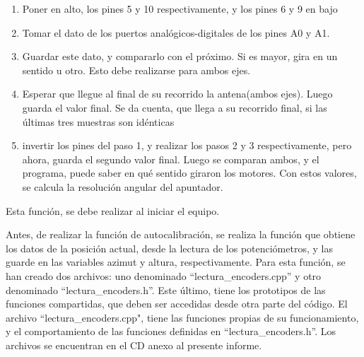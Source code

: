 \begin{enumerate}
	\item Poner en alto, los pines 5 y 10 respectivamente, y los pines 6 y 9 en bajo  
	\item Tomar el dato de los puertos analógicos-digitales de los pines A0 y A1. 
	\item Guardar este dato, y compararlo con el próximo. Si es mayor, gira en un sentido u otro. Esto debe realizarse para ambos ejes. 
	\item Esperar que llegue al final de su recorrido la antena(ambos ejes). Luego guarda el valor final. Se da cuenta, que llega a su recorrido final, si las últimas tres muestras son idénticas
   \item invertir los pines del paso 1, y realizar los pasos 2 y 3 respectivamente, pero ahora, guarda el segundo valor final. Luego se comparan ambos, y el programa, puede saber en qué sentido giraron los motores. Con estos valores, se calcula la resolución angular del apuntador. 
\end{enumerate}

Esta función, se debe realizar al iniciar el equipo.  

Antes, de realizar la función de autocalibración, se realiza la función que obtiene los datos de la posición actual, desde la lectura de los potenciómetros, y las guarde en las variables azimut y altura, respectivamente. Para esta función, se han creado dos archivos: uno denominado ``lectura\_encoders.cpp'' y otro denominado ``lectura\_encoders.h''. Este último, tiene los prototipos de las funciones compartidas, que deben ser accedidas desde otra parte del código. El archivo ``lectura\_encoders.cpp", tiene las funciones propias de su funcionamiento, y el comportamiento de las funciones definidas en ``lectura\_encoders.h''. Los archivos se encuentran en el CD anexo al presente informe. 
%
%
%

